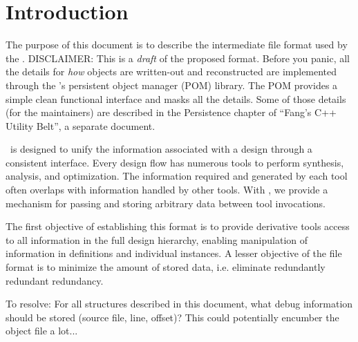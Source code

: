 
\chapter{Introduction}
\label{sec:intro}

The purpose of this document is to describe the intermediate file
format used by the \hackt.  
DISCLAIMER: This is a \emph{draft} of the proposed format.  
Before you panic, all the details for \emph{how} objects are
written-out and reconstructed are implemented through 
the \hackt's persistent object manager (POM) library.  
The POM provides a simple clean functional interface and masks
all the details.  
Some of those details (for the maintainers) are described in
the Persistence chapter of ``Fang's C++ Utility Belt'', a separate document.  

\hackt\ is designed to unify the information associated with a design
through a consistent interface.  
Every design flow has numerous tools to perform synthesis, analysis, 
and optimization.  
The information required and generated by each tool often overlaps
with information handled by other tools.  
With \hackt, we provide a mechanism for passing and storing arbitrary data 
between tool invocations.  

The first objective of establishing this format is to provide
derivative tools access to all information in the full design hierarchy, 
enabling manipulation of information in definitions and individual instances.  
A lesser objective of the file format is to minimize the amount
of stored data, i.e. eliminate redundantly redundant redundancy.  

To resolve:
For all structures described in this document, 
what debug information should be stored (source file, line, offset)?
This could potentially encumber the object file a lot...

